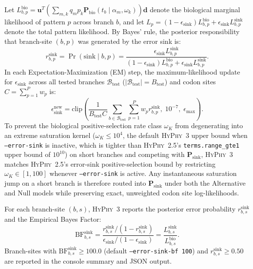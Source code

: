 \documentclass[11pt]{article}
\begin{document}
Let $L_{b,p}^{\text{bio}} = \bm{u}^T \left(\sum_{m,k} q_m p_k \bm{P}_{\text{bio}}(t_b \mid \alpha_m, \omega_k)\right) \bm{d}$ denote the biological marginal likelihood of pattern $p$ across branch $b$, and let $L_p = (1 - \epsilon_{\text{sink}}) L_{b,p}^{\text{bio}} + \epsilon_{\text{sink}} L_{b,p}^{\text{sink}}$ denote the total pattern likelihood. By Bayes' rule, the posterior responsibility that branch-site $(b, p)$ was generated by the error sink is:
\begin{equation}
    r_{b,p}^{\text{sink}} = \Pr(\text{sink} \mid b, p) = \frac{\epsilon_{\text{sink}} L_{b,p}^{\text{sink}}}{(1 - \epsilon_{\text{sink}}) L_{b,p}^{\text{bio}} + \epsilon_{\text{sink}} L_{b,p}^{\text{sink}}}.
    \label{eq:resp}
\end{equation}
In each Expectation-Maximization (EM) step, the maximum-likelihood update for $\epsilon_{\text{sink}}$ across all tested branches $\mathcal{B}_{\text{test}}$ ($|\mathcal{B}_{\text{test}}| = B_{\text{test}}$) and codon sites $C = \sum_{p=1}^P w_p$ is:
\begin{equation}
    \epsilon_{\text{sink}}^{\text{new}} = \text{clip}\left( \frac{1}{B_{\text{test}} C} \sum_{b \in \mathcal{B}_{\text{test}}} \sum_{p=1}^P w_p r_{b,p}^{\text{sink}}, \; 10^{-7}, \; \epsilon_{\max} \right).
    \label{eq:em_eps}
\end{equation}
To prevent the biological positive-selection rate class $\omega_K$ from degenerating into an extreme saturation kernel ($\omega_K \le 10^4$, the default \textsc{HyPhy}~3 upper bound when \texttt{--error-sink} is inactive, which is tighter than \textsc{HyPhy}~2.5's \texttt{terms.range\_gte1} upper bound of $10^{10}$) on short branches and competing with $\bm{P}_{\text{sink}}$, \textsc{HyPhy}~3 matches \textsc{HyPhy}~2.5's error-sink positive-selection bound by restricting $\omega_K \in [1, 100]$ whenever \texttt{--error-sink} is active. Any instantaneous saturation jump on a short branch is therefore routed into $\bm{P}_{\text{sink}}$ under both the Alternative and Null models while preserving exact, unweighted codon site log-likelihoods.

For each branch-site $(b, s)$, \textsc{HyPhy}~3 reports the posterior error probability $r_{b,s}^{\text{sink}}$ and the Empirical Bayes Factor:
\begin{equation}
    \text{BF}_{b,s}^{\text{sink}} = \frac{r_{b,s}^{\text{sink}} / (1 - r_{b,s}^{\text{sink}})}{\epsilon_{\text{sink}} / (1 - \epsilon_{\text{sink}})} = \frac{L_{b,s}^{\text{sink}}}{L_{b,s}^{\text{bio}}}.
\end{equation}
Branch-sites with $\text{BF}_{b,s}^{\text{sink}} \ge 100.0$ (default \texttt{--error-sink-bf 100}) and $r_{b,s}^{\text{sink}} \ge 0.50$ are reported in the console summary and JSON output.
\end{document}
